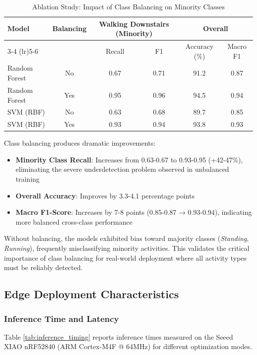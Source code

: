 \begin{table}[H]
    \centering
    \caption{Ablation Study: Impact of Class Balancing on Minority Classes}
    \begin{tabular}{@{}lccccc@{}}
        \toprule
        \multirow{2}{*}{Model} & \multirow{2}{*}{Balancing} & \multicolumn{2}{c}{Walking Downstairs (Minority)} & \multicolumn{2}{c}{Overall} \\
        \cmidrule(lr){3-4} \cmidrule(lr){5-6}
        & & Recall & F1 & Accuracy (\%) & Macro F1 \\ 
        \midrule
        Random Forest & No & 0.67 & 0.71 & 91.2 & 0.87 \\
        Random Forest & Yes & 0.95 & 0.96 & 94.5 & 0.94 \\
        \midrule
        SVM (RBF) & No & 0.63 & 0.68 & 89.7 & 0.85 \\
        SVM (RBF) & Yes & 0.93 & 0.94 & 93.8 & 0.93 \\
        \bottomrule
    \end{tabular}
    \label{tab:class_balance_ablation}
\end{table}

Class balancing produces dramatic improvements:
\begin{itemize}
    \item \textbf{Minority Class Recall}: Increases from 0.63-0.67 to 0.93-0.95 (+42-47\%), eliminating the severe underdetection problem observed in unbalanced training
    \item \textbf{Overall Accuracy}: Improves by 3.3-4.1 percentage points
    \item \textbf{Macro F1-Score}: Increases by 7-8 points (0.85-0.87 → 0.93-0.94), indicating more balanced cross-class performance
\end{itemize}

Without balancing, the models exhibited bias toward majority classes (\textit{Standing}, \textit{Running}), frequently misclassifying minority activities. This validates the critical importance of class balancing for real-world deployment where all activity types must be reliably detected.

\subsection{Edge Deployment Characteristics}

\subsubsection{Inference Time and Latency}
Table \ref{tab:inference_timing} reports inference times measured on the Seeed XIAO nRF52840 (ARM Cortex-M4F @ 64MHz) for different optimization modes.

